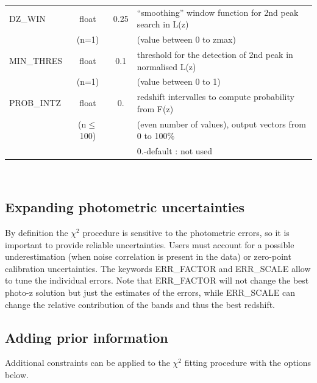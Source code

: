 \documentclass[12pt]{article}
\begin{document}
\begin{tabular}{lccl}
% 
DZ\_WIN             & float    &  0.25   &  ``smoothing''  window function for 2nd peak search in L(z)   \\
                           & (n=1)   &           &   (value between 0 to zmax)                                       \\
%
MIN\_THRES     & float   & 0.1     &   threshold for the detection of 2nd peak in normalised L(z)   \\
                          & (n=1)  &          &      (value between 0 to 1)                                       \\
%
PROB\_INTZ    & float   & 0.          &  redshift intervalles to compute probability from F(z)         \\
                         & (n$\le$ 100) &     &  (even number of values), output vectors  from 0 to 100\%         \\ 
                         &          &               &   0.-default : not used                                           \\   
%
\hline
\hline
\end{tabular}
\vspace*{0.5cm}\\

\subsection{Expanding photometric uncertainties}

 By definition the $\chi^2$ procedure is  sensitive to the photometric errors, so it  is  important to provide reliable uncertainties. Users must account for  a  possible underestimation  (when noise correlation is present in the data) or zero-point calibration 
 uncertainties. The keywords ERR\_FACTOR and ERR\_SCALE allow to tune the individual errors. 
 Note that  ERR\_FACTOR will not change the best photo-z solution but just the estimates of the errors, while  ERR\_SCALE can change the relative contribution of the bands and thus the best redshift.\\


 
  
   

\subsection{Adding prior information}


Additional constraints can be applied to the $\chi^2$ fitting  procedure with the options below. \\
 
\end{document}
